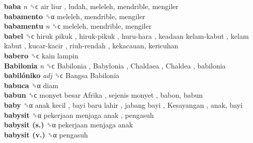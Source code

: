 \textbf{baba} \emph{n}  ␝ϲ   air liur , ludah, meleleh, mendrible, mengiler  \\
\textbf{babamento} ␝α  meleleh, mendrible, mengiler  \\
\textbf{babamentu} \emph{n}  ␝ϲ  meleleh, mendrible, mengiler  \\
\textbf{babel} ␝ϲ   hiruk pikuk ,  hiruk-pikuk ,  huru-hara ,  keadaan kelam-kabut ,  kelam kabut ,  kucar-kacir ,  riuh-rendah , kekacauan, kericuhan  \\
\textbf{babero} ␝ϲ   kain lampin   \\
\textbf{Babilonia} \emph{n}  ␝ϲ   Babilonia ,  Babylonia ,  Chaldaea ,  Chaldea , babilonia  \\
\textbf{babilóniko} \emph{adj}  ␝ϲ   Bangsa Babilonia   \\
\textbf{babuca} ␝α  diam  \\
\textbf{babun} ␝ϲ   monyet besar Afrika ,  sejenis monyet , babon, babun  \\
\textbf{baby} ␝α   anak kecil ,  bayi baru lahir ,  jabang bayi ,  Kesayangan , anak, bayi  \\
\textbf{babysit} ␝α   pekerjaan menjaga anak , pengasuh  \\
\textbf{babysit (s.)} ␝α   pekerjaan menjaga anak   \\
\textbf{babysit (v.)} ␝α  pengasuh  \\
